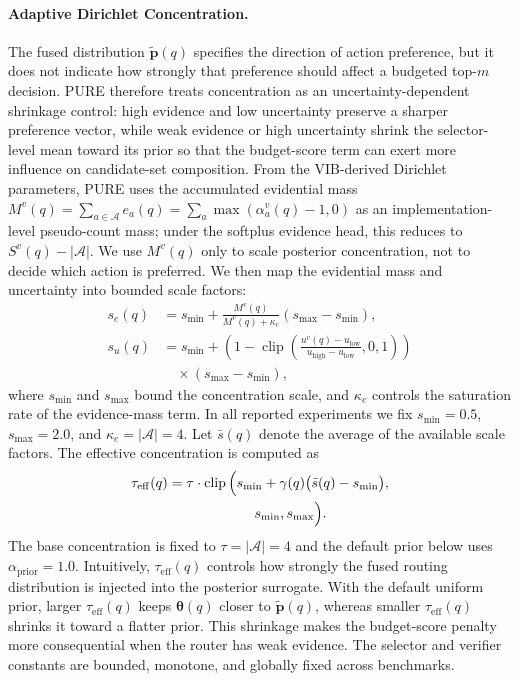 \documentclass[a4paper,fleqn]{cas-dc}
\begin{document}
\paragraph{Adaptive Dirichlet Concentration.}
The fused distribution $\tilde{\mathbf{p}}(q)$ specifies the direction of action preference, but it does not indicate how strongly that preference should affect a budgeted top-$m$ decision. PURE therefore treats concentration as an uncertainty-dependent shrinkage control: high evidence and low uncertainty preserve a sharper preference vector, while weak evidence or high uncertainty shrink the selector-level mean toward its prior so that the budget-score term can exert more influence on candidate-set composition. From the VIB-derived Dirichlet parameters, PURE uses the accumulated evidential mass $M^v(q)=\sum_{a\in\mathcal{A}}e_a(q)=\sum_a\max(\alpha_a^v(q)-1,0)$ as an implementation-level pseudo-count mass; under the softplus evidence head, this reduces to $S^v(q)-|\mathcal{A}|$. We use $M^v(q)$ only to scale posterior concentration, not to decide which action is preferred. We then map the evidential mass and uncertainty into bounded scale factors:
\begin{equation}
\label{eq:concentration_scales}
\begin{aligned}
s_e(q)
&=
s_{\min}
+
\frac{M^v(q)}
{M^v(q)+\kappa_e}
\left(s_{\max}-s_{\min}\right),\\
s_u(q)
&=
s_{\min}
+
\left(
1-
\operatorname{clip}
\left(
\frac{u^v(q)-u_{\mathrm{low}}}
{u_{\mathrm{high}}-u_{\mathrm{low}}},
0,1
\right)
\right)\\
&\quad\times
\left(s_{\max}-s_{\min}\right),
\end{aligned}
\end{equation}
where $s_{\min}$ and $s_{\max}$ bound the concentration scale, and $\kappa_e$ controls the saturation rate of the evidence-mass term. 
In all reported experiments we fix $s_{\min}=0.5$, $s_{\max}=2.0$, and $\kappa_e=|\mathcal{A}|=4$. 
Let $\bar{s}(q)$ denote the average of the available scale factors. The effective concentration is computed as
\begin{equation}
\label{eq:effective_tau}
\begin{aligned}
\tau_{\mathrm{eff}}(q)
&=
\tau\cdot
\operatorname{clip}
\Big(
s_{\min}
+
\gamma(q)\big(\bar{s}(q)-s_{\min}\big),\\
&\hspace{6.2em}
s_{\min},
s_{\max}
\Big).
\end{aligned}
\end{equation}
The base concentration is fixed to $\tau=|\mathcal{A}|=4$ and the default prior below uses $\alpha_{\mathrm{prior}}=1.0$. 
Intuitively, $\tau_{\mathrm{eff}}(q)$ controls how strongly the fused routing distribution is injected into the posterior surrogate. With the default uniform prior, larger $\tau_{\mathrm{eff}}(q)$ keeps $\boldsymbol{\theta}(q)$ closer to $\tilde{\mathbf{p}}(q)$, whereas smaller $\tau_{\mathrm{eff}}(q)$ shrinks it toward a flatter prior. This shrinkage makes the budget-score penalty more consequential when the router has weak evidence. The selector and verifier constants are bounded, monotone, and globally fixed across benchmarks.
\end{document}
